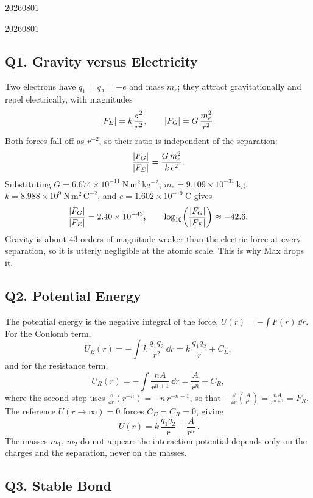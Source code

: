 \begin{problem}{20260801}
\end{problem}

\begin{solution}{20260801}

\subsection*{Q1. Gravity versus Electricity}

Two electrons have $q_1 = q_2 = -e$ and mass $m_e$; they attract gravitationally and repel electrically, with magnitudes
\[
  \left\lvert F_E \right\rvert = k\,\frac{e^{2}}{r^{2}},
  \qquad
  \left\lvert F_G \right\rvert = G\,\frac{m_e^{2}}{r^{2}}.
\]
Both forces fall off as $r^{-2}$, so their ratio is independent of the separation:
\[
  \frac{\left\lvert F_G \right\rvert}{\left\lvert F_E \right\rvert} = \frac{G\,m_e^{2}}{k\,e^{2}}.
\]
Substituting $G = 6.674\times10^{-11}\ \mathrm{N\,m^{2}\,kg^{-2}}$, $m_e = 9.109\times10^{-31}\ \mathrm{kg}$, $k = 8.988\times10^{9}\ \mathrm{N\,m^{2}\,C^{-2}}$, and $e = 1.602\times10^{-19}\ \mathrm{C}$ gives
\[
  \frac{\left\lvert F_G \right\rvert}{\left\lvert F_E \right\rvert} = 2.40\times10^{-43},
  \qquad
  \log_{10}\!\left(\frac{\left\lvert F_G \right\rvert}{\left\lvert F_E \right\rvert}\right) \approx -42.6.
\]
Gravity is about $43$ orders of magnitude weaker than the electric force at every separation, so it is utterly negligible at the atomic scale.  This is why Max drops it.

\subsection*{Q2. Potential Energy}

The potential energy is the negative integral of the force, $U(r) = -\int F(r)\,\dd r$.  For the Coulomb term,
\[
  U_E(r) = -\int k\,\frac{q_1 q_2}{r^{2}}\,\dd r
          = k\,\frac{q_1 q_2}{r} + C_E,
\]
and for the resistance term,
\[
  U_R(r) = -\int \frac{nA}{r^{n+1}}\,\dd r
          = \frac{A}{r^{n}} + C_R,
\]
where the second step uses $\frac{\dd}{\dd r}(r^{-n}) = -n\,r^{-n-1}$, so that $-\frac{\dd}{\dd r}\!\left(\frac{A}{r^n}\right) = \frac{nA}{r^{n+1}} = F_R$.  The reference $U(r \to \infty) = 0$ forces $C_E = C_R = 0$, giving
\[
  \boxed{\,U(r) = k\,\frac{q_1 q_2}{r} + \frac{A}{r^{n}}\,}.
\]
The masses $m_1$, $m_2$ do not appear: the interaction potential depends only on the charges and the separation, never on the masses.

\subsection*{Q3. Stable Bond}


\end{solution}
